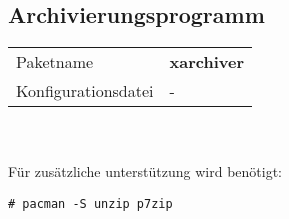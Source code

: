 \subsection{Archivierungsprogramm}
\begin{tabular}{l|l}
Paketname & \textbf{xarchiver} \\ 
Konfigurationsdatei & - \\
\end{tabular}
\\ \\
Für zusätzliche unterstützung wird benötigt:
\begin{lstlisting}[style=Bash]
# pacman -S unzip p7zip 
\end{lstlisting}
